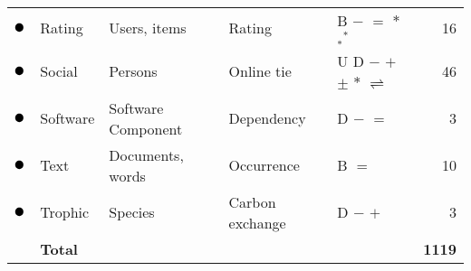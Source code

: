 \begin{tabular}{lllllr}
\textcolor{colorRating}{$\newmoon$} &Rating & Users, items & Rating & \phantom{U} \phantom{D} B $-$ $=$ \phantom{$+$} \phantom{$\pm$} \phantom{$\stackrel{+}{=}$} $*$ $_*{}^*$ \phantom{$\rightleftharpoons$} \phantom{$++$}  &  16\\
\textcolor{colorSocial}{$\newmoon$} &Social & Persons & Online tie & U D \phantom{B} $-$ \phantom{$=$} $+$ $\pm$ \phantom{$\stackrel{+}{=}$} $*$ \phantom{$_*{}^*$} $\rightleftharpoons$ \phantom{$++$}  &  46\\
\textcolor{colorSoftware}{$\newmoon$} &Software & Software Component & Dependency & \phantom{U} D \phantom{B} $-$ $=$ \phantom{$+$} \phantom{$\pm$} \phantom{$\stackrel{+}{=}$} \phantom{$*$} \phantom{$_*{}^*$} \phantom{$\rightleftharpoons$} \phantom{$++$}  &  3\\
\textcolor{colorText}{$\newmoon$} &Text & Documents, words & Occurrence & \phantom{U} \phantom{D} B \phantom{$-$} $=$ \phantom{$+$} \phantom{$\pm$} \phantom{$\stackrel{+}{=}$} \phantom{$*$} \phantom{$_*{}^*$} \phantom{$\rightleftharpoons$} \phantom{$++$}  &  10\\
\textcolor{colorTrophic}{$\newmoon$} &Trophic & Species & Carbon exchange & \phantom{U} D \phantom{B} $-$ \phantom{$=$} $+$ \phantom{$\pm$} \phantom{$\stackrel{+}{=}$} \phantom{$*$} \phantom{$_*{}^*$} \phantom{$\rightleftharpoons$} \phantom{$++$}  &  3\\
\midrule
& \textbf{Total} &&&& \textbf{1119}\\
\bottomrule
\end{tabular}
